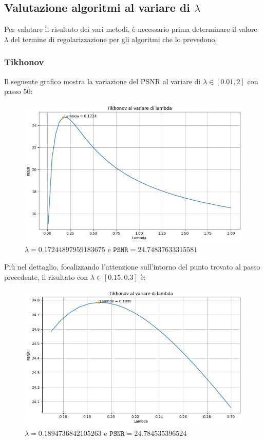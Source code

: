 \documentclass[11pt]{article}
\begin{document}
\subsection*{Valutazione algoritmi al variare di $\lambda$}
Per valutare il risultato dei vari metodi, è necessario prima determinare il valore $\lambda$ del termine di regolarizzazione per gli algoritmi che lo prevedono.
\subsubsection*{Tikhonov}
Il seguente grafico mostra la variazione del PSNR al variare di $\lambda \in [0.01, 2]$ con passo 50:
\begin{figure}[H]
    \centering
    \includegraphics[width=15cm]{tikhonov_lambda1.png}
    \caption{$\lambda=0.17244897959183675$ e $\texttt{PSNR}=24.74837633315581$}
    \label{fig:tikhonov_lambda1}
\end{figure}
Più nel dettaglio, focalizzando l'attenzione sull'intorno del punto trovato al passo precedente, il risultato con $\lambda \in [0.15, 0.3]$ è:
\begin{figure}[H]
    \centering
    \includegraphics[width=15cm]{tikhonov_lambda2.png}
    \caption{$\lambda=0.1894736842105263$ e $\texttt{PSNR}=24.784535396524$}
    \label{fig:tikhonov_lambda2}
\end{figure}
\end{document}
